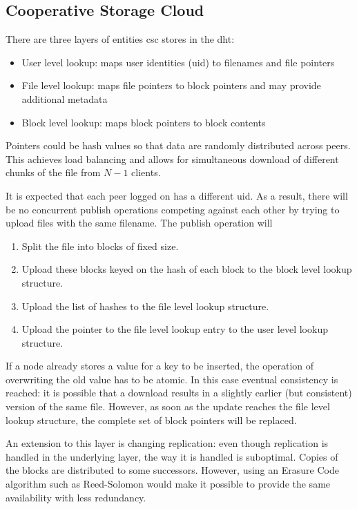 \documentclass[12pt]{article}
\begin{document}
\subsection{Cooperative Storage Cloud}

There are three layers of entities \gls{csc} stores in the \gls{dht}:
\begin{itemize}
\item{User level lookup: maps user identities (\gls{uid}) to filenames and file pointers}
\item{File level lookup: maps file pointers to block pointers and may provide additional metadata}
\item{Block level lookup: maps block pointers to block contents}
\end{itemize}

Pointers could be hash values so that data are randomly distributed across peers. This achieves load balancing and allows for simultaneous download of different chunks of the file from $N-1$ clients.

It is expected that each peer logged on has a different \gls{uid}. As a result, there will be no concurrent publish operations competing against each other by trying to upload files with the same filename. The publish operation will 

\begin{enumerate}
\item{Split the file into blocks of fixed size.}
\item{Upload these blocks keyed on the hash of each block to the block level lookup structure.}
\item{Upload the list of hashes to the file level lookup structure.}
\item{Upload the pointer to the file level lookup entry to the user level lookup structure.}
\end{enumerate}

If a node already stores a value for a key to be inserted, the operation of overwriting the old value has to be atomic. In this case eventual consistency is reached: it is possible that a download results in a slightly earlier (but consistent) version of the same file. However, as soon as the update reaches the file level lookup structure, the complete set of block pointers will be replaced.

An extension to this layer is changing replication: even though replication is handled in the underlying layer, the way it is handled is suboptimal. Copies of the blocks are distributed to some successors. However, using an Erasure Code algorithm such as Reed-Solomon would make it possible to provide the same availability with less redundancy.
\end{document}
